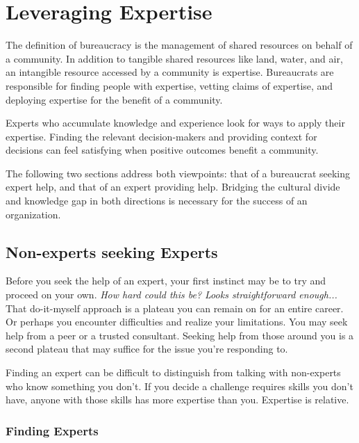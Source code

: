 \section{Leveraging Expertise\label{sec:expertise}}



The definition of \gls{bureaucracy} is the management of shared resources on behalf of a community. In addition to tangible shared resources like land, water, and air, an intangible resource accessed by a community is expertise. Bureaucrats are responsible for finding people with expertise, vetting claims of expertise, and deploying expertise for the benefit of a community. 

Experts who accumulate knowledge and experience look for ways to apply their expertise. Finding the relevant decision-makers and providing context for decisions can feel satisfying when positive  outcomes benefit a community. 


The following two sections address both viewpoints: that of a bureaucrat seeking expert help, and that of an expert providing help. Bridging the cultural divide and knowledge gap in both directions is necessary for the success of an organization.

\subsection*{Non-experts seeking Experts}

Before you seek the help of an expert, your first instinct may be to try and proceed on your own. \textit{How hard could this be? Looks straightforward enough...} That do-it-myself approach is a plateau you can remain on for an entire career. Or perhaps you encounter difficulties and realize your limitations. You may seek help from a peer or a trusted consultant. Seeking help from those around you is a second plateau that may suffice for the issue you're responding to. 

Finding an expert can be difficult to distinguish from talking with non-experts who know something you don't. If you decide a challenge requires skills you don't have, anyone with those skills has more expertise than you. Expertise is relative. 

\subsubsection*{Finding Experts}

